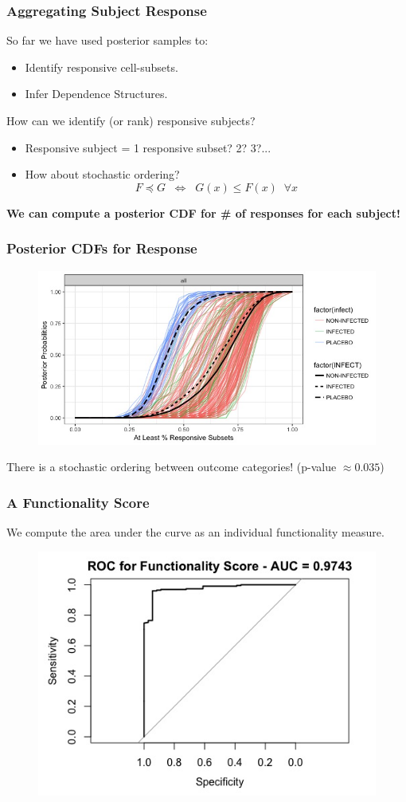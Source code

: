 \documentclass{beamer}
\theoremstyle{definition}
\begin{document}
\begin{frame}
\frametitle{Aggregating Subject Response}
So far we have used posterior samples to:
\begin{itemize}
\item Identify responsive cell-subsets.
\item Infer Dependence Structures. 
\end{itemize}

\pause
\vspace{0.5 cm}
How can we identify (or rank) responsive subjects?
\begin{itemize}
\item Responsive subject = 1 responsive subset? 2? 3?...
\item How about stochastic ordering? 
$$
F \preceq G \;\; \Leftrightarrow \;\; G(x) \leq F(x) \;\; \forall x
$$
\end{itemize}

\vspace{0.3 cm}
\pause
\textbf{We can compute a posterior CDF for \# of responses for each subject!}
\end{frame}


\begin{frame}
\frametitle{Posterior CDFs for Response}
\begin{figure}[]
\includegraphics[width=11 cm]{figures/RV144CDFs}
\end{figure}
There is a stochastic ordering between outcome categories! (p-value $\approx 0.035$)
\end{frame}


\begin{frame}
\frametitle{A Functionality Score}
We compute the area under the curve as an individual functionality measure. 
\begin{figure}[]
\includegraphics[width=8 cm]{figures/rv144funcroc}
\end{figure}
\end{frame}
\end{document}
